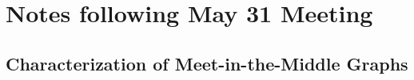 \documentclass{article}
\theoremstyle{remark}
\newtheorem{lemma}{Lemma}
\begin{document}

\section{Notes following May 31 Meeting}

\subsection{Characterization of Meet-in-the-Middle Graphs}
\end{document}
